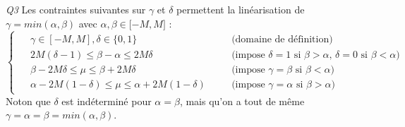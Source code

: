 \documentclass[a4paper,12pt]{article}
\begin{document}
    \textit{Q3 }
    Les contraintes suivantes sur $\gamma$ et $\delta$ permettent la linéarisation de $ \gamma = min(\alpha, \beta)$ avec $\alpha, \beta \in \lbrack -M, M \rbrack$ : 
    \begin{equation*}
        \begin{cases}
            \begin{alignedat}{2}
                &\gamma \in [-M,M], \delta \in \lbrace 0,1 \rbrace && \quad \text{(domaine de définition)} \\ 
                &2M(\delta - 1) \leq \beta - \alpha \leq 2M \delta && \quad \text{(impose } \delta = 1 \text{ si }  \beta > \alpha \text{, }\delta = 0 \text{ si }  \beta < \alpha \text{)}\\
                &\beta - 2M\delta \leq \mu \leq \beta + 2M\delta && \quad \text{(impose } \gamma = \beta \text{ si }  \beta < \alpha \text{)}\\
                &\alpha - 2M(1-\delta) \leq \mu \leq \alpha + 2M(1-\delta) && \quad \text{(impose } \gamma = \alpha \text{ si }  \beta > \alpha \text{)}
            \end{alignedat}
        \end{cases}
    \end{equation*}
    Noton que $\delta$ est indéterminé pour $\alpha = \beta$, mais qu'on a tout de même $\gamma = \alpha = \beta = min(\alpha, \beta)$.
    
\end{document}
